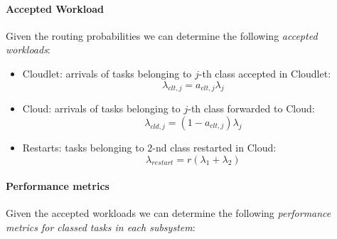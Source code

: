 \paragraph{Accepted Workload}
Given the routing probabilities we can determine the following \textit{accepted workloads}:

\begin{itemize}
	\item Cloudlet: arrivals of tasks belonging to $j$-th class accepted in Cloudlet:
	\begin{equation}
	\lambda_{clt,j} = a_{clt,j}\lambda_{j}
	\end{equation}
	
	\item Cloud: arrivals of tasks belonging to $j$-th class forwarded to Cloud:
	\begin{equation}
	\lambda_{cld,j} = (1-a_{clt,j})\lambda_{j}
	\end{equation}
	
	\item Restarts: tasks belonging to $2$-nd class restarted in Cloud:
	\begin{equation}
	\lambda_{restart} = r(\lambda_{1}+\lambda_{2})
	\end{equation}
\end{itemize}

\paragraph{Performance metrics}
Given the accepted workloads we can determine the following \textit{performance metrics for classed tasks in each subsystem}:

